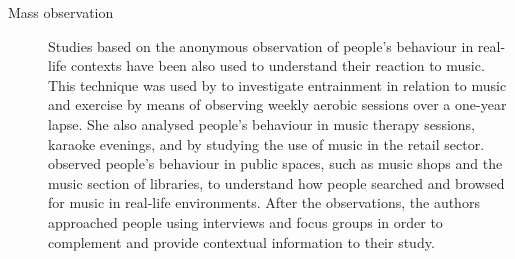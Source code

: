 \begin{description}
	
	\item[Mass observation] Studies based on the anonymous observation of people's behaviour in real-life contexts have been also used to understand their reaction to music. This technique was used by \textcite{denora00music} to investigate entrainment in relation to music and exercise by means of observing weekly aerobic sessions over a one-year lapse. She also analysed people's behaviour in music therapy sessions, karaoke evenings, and by studying the use of music in the retail sector. \textcite{cunningham03ethnographic} observed people's behaviour in public spaces, such as music shops and the music section of libraries, to understand how people searched and browsed for music in real-life environments. After the observations, the authors approached people using interviews and focus groups in order to complement and provide contextual information to their study.


\end{description}
